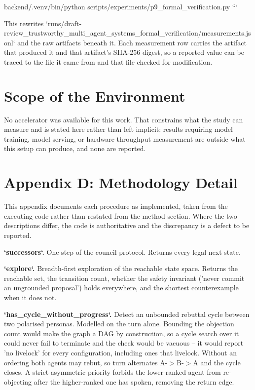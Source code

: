\documentclass[10pt,twocolumn,letterpaper]{article}
\begin{document}
backend/.venv/bin/python scripts/experiments/p9\_formal\_verification.py
```

This rewrites `runs/draft-review\_trustworthy\_multi\_agent\_systems\_formal\_verification/measurements.jsonl` and the raw artifacts beneath it. Each measurement row carries the artifact that produced it and that artifact's SHA-256 digest, so a reported value can be traced to the file it came from and that file checked for modification.


\section{Scope of the Environment}


No accelerator was available for this work. That constrains what the study can measure and is stated here rather than left implicit: results requiring model training, model serving, or hardware throughput measurement are outside what this setup can produce, and none are reported.




\section{Appendix D: Methodology Detail}


This appendix documents each procedure as implemented, taken from the executing code rather than restated from the method section. Where the two descriptions differ, the code is authoritative and the discrepancy is a defect to be reported.

\textbf{`successors`.} One step of the council protocol. Returns every legal next state.

\textbf{`explore`.} Breadth-first exploration of the reachable state space. Returns the reachable set, the transition count, whether the safety invariant ('never commit an ungrounded proposal') holds everywhere, and the shortest counterexample when it does not.

\textbf{`has\_cycle\_without\_progress`.} Detect an unbounded rebuttal cycle between two polarised personas. Modelled on the turn alone. Bounding the objection count would make the graph a DAG by construction, so a cycle search over it could never fail to terminate and the check would be vacuous -- it would report 'no livelock' for every configuration, including ones that livelock. Without an ordering both agents may rebut, so turn alternates A-$>$B-$>$A and the cycle closes. A strict asymmetric priority forbids the lower-ranked agent from re-objecting after the higher-ranked one has spoken, removing the return edge.
\end{document}
